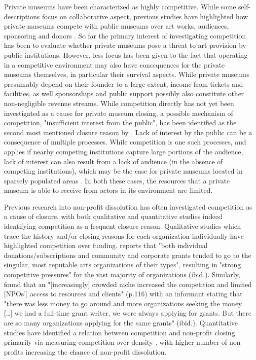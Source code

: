 \documentclass[12pt]{article}
\begin{document}
Private museums have been characterized as highly competitive.
While some self-descriptions focus on collaborative aspect, previous studies have highlighted how private museums compete with public museums over art works, audiences, sponsoring and donors \parencite[p.4]{Kolbe_etal_2022_privatemuseum}. 
So far the primary interest of investigating competition has been to evaluate whether private museums pose a threat to art provision by public institutions.
However, less focus has been given to the fact that operating in a competitive environment may also have consequences for the private museums themselves, in particular their survival aspects.
While private museums presumably depend on their founder to a large extent, income from tickets and facilities, as well sponsorships and public support possibly also constitute other non-negligible revenue streams.
While competition directly has not yet been investigated as a cause for private museum closing, a possible mechanism of competition, "insufficient interest from the public", has been identified as the second most mentioned closure reason by \textcite[p.6]{Velthuis_Gera_2024_fragility}. 
Lack of interest by the public can be a consequence of multiple processes.
While competition is one such processes, and applies if nearby competing institutions capture large portions of the audience, lack of interest can also result from a lack of audience (in the absence of competing institutions), which may be the case for private museums located in sparsely populated areas \parencite{Foster_2015_cube}.
In both these cases, the resources that a private museum is able to receive from actors in its environment are limited. 



Previous research into non-profit dissolution has often investigated competition as a cause of closure, with both qualitative and quantitative studies indeed identifying competition as a frequent closure reason.
Qualitative studies which trace the history and/or closing reasons for each organization individually have highlighted competition over funding.
\textcite{Hager_1999_demise} reports that "both individual donations/subscriptions and community and corporate grants tended to go to the singular, most reputable arts organizations of their types", resulting in "strong competitive pressures" for the vast majority of organizations (ibid.).
Similarly, \textcite{HernandezOrtiz_2022_discontinuity} found that an "[increasingly] crowded niche increased the competition and limited [NPOs'] access to resources and clients" (p.116) with an informant stating that "there was less money to go around and more organizations seeking the money [\ldots{}] we had a full-time grant writer, we were always applying for grants. But there are so many organizations applying for the same grants" (ibid.).
Quantitative studies have identified a relation between competition and non-profit closing primarily via measuring competition over density \cite{Park_Shon_Lu_2021_mortality,Haugh_etal_2021_nascent,Lu_Shon_Zhang_2019_dissolution}, with higher number of non-profits increasing the chance of non-profit dissolution.
\end{document}
